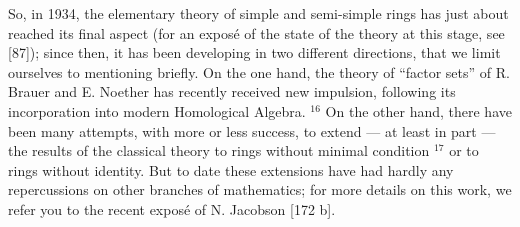 So, in 1934, the elementary theory of simple and semi-simple rings has just about reached its final aspect (for an exposé of the state of the theory at this stage, see {[}87{]}); since then, it has been developing in two different directions, that we limit ourselves to mentioning briefly. On the one hand, the theory of ``factor sets'' of R. Brauer and E. Noether has recently received new impulsion, following its incorporation into modern Homological Algebra. \(^{16}\) On the other hand, there have been many attempts, with more or less success, to extend --- at least in part --- the results of the classical theory to rings without minimal condition \(^{17}\) or to rings without identity. But to date these extensions have had hardly any repercussions on other branches of mathematics; for more details on this work, we refer you to the recent exposé of N. Jacobson {[}172 b{]}.
\relax{}
